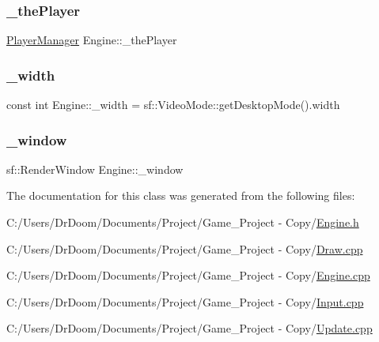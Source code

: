 \subsubsection{\texorpdfstring{\+\_\+the\+Player}{\_thePlayer}}
{\footnotesize\ttfamily \hyperlink{class_player_manager}{Player\+Manager} Engine\+::\+\_\+the\+Player\hspace{0.3cm}{\ttfamily [private]}}

\mbox{\label{class_engine_a535dc0c572ec7af354a4b15f20bb02df}} 
\subsubsection{\texorpdfstring{\+\_\+width}{\_width}}
{\footnotesize\ttfamily const int Engine\+::\+\_\+width = sf\+::\+Video\+Mode\+::get\+Desktop\+Mode().width\hspace{0.3cm}{\ttfamily [private]}}

\mbox{\label{class_engine_afd93e6a52301e792650f99043f113cbf}} 
\subsubsection{\texorpdfstring{\+\_\+window}{\_window}}
{\footnotesize\ttfamily sf\+::\+Render\+Window Engine\+::\+\_\+window\hspace{0.3cm}{\ttfamily [private]}}



The documentation for this class was generated from the following files\+:\begin{DoxyCompactItemize}
\item 
C\+:/\+Users/\+Dr\+Doom/\+Documents/\+Project/\+Game\+\_\+\+Project -\/ Copy/\hyperlink{_engine_8h}{Engine.\+h}\item 
C\+:/\+Users/\+Dr\+Doom/\+Documents/\+Project/\+Game\+\_\+\+Project -\/ Copy/\hyperlink{_draw_8cpp}{Draw.\+cpp}\item 
C\+:/\+Users/\+Dr\+Doom/\+Documents/\+Project/\+Game\+\_\+\+Project -\/ Copy/\hyperlink{_engine_8cpp}{Engine.\+cpp}\item 
C\+:/\+Users/\+Dr\+Doom/\+Documents/\+Project/\+Game\+\_\+\+Project -\/ Copy/\hyperlink{_input_8cpp}{Input.\+cpp}\item 
C\+:/\+Users/\+Dr\+Doom/\+Documents/\+Project/\+Game\+\_\+\+Project -\/ Copy/\hyperlink{_update_8cpp}{Update.\+cpp}\end{DoxyCompactItemize}

